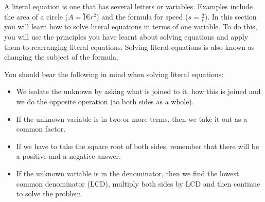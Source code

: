     
%             
\label{m39258*eip-224}A literal equation is one that has several letters or variables. Examples include the area of a circle (\begin{math}A=\mathrm{Ï€}{r}^{2}\end{math}) and the formula for speed (\begin{math}s=\frac{d}{t}\end{math}). In this section you will learn how to solve literal equations in terms of one variable. To do this, you will use the principles you have learnt about solving equations and apply them to rearranging literal equations. Solving literal equations is also known as changing the subject of the formula.
\par 
\label{m39258*id9732423}
You should bear the following in mind when solving literal equations: \label{m39258*id987324}\begin{itemize}[noitemsep]
            \item We isolate the unknown by asking what is joined to it, how this is joined and we do the opposite operation (to both sides as a whole).
\item If the unknown variable is in two or more terms, then we take it out as a common factor. 
\item  If we have to take the square root of both sides, remember that there will be a positive and a negative answer.
\item  If the unknown variable is in the denominator, then we find the lowest common denominator (LCD), multiply both sides by LCD and then continue to solve the problem.
\end{itemize}
        
\par 
\par
            \label{m39258*eip-979}\vspace{.5cm} 
      
